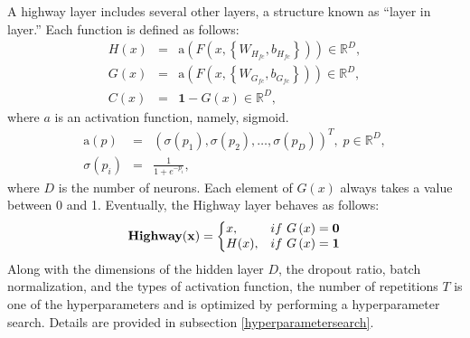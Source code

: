 \documentclass[useamsfonts]{pasj01}
\begin{document}
A highway layer includes several other layers, a structure known as ``layer in layer.'' Each function is defined as follows: 
\begin{eqnarray}
    H \left(x\right) &=& \mathrm{a} \left( F \left(x, \left\{W_{H_{fc}}, b_{H_{fc}}\right\}\right) \right) \in \mathbb{R}^D, \\
    G \left(x\right) &=& \mathrm{a} \left( F \left(x, \left\{W_{G_{fc}}, b_{G_{fc}}\right\}\right) \right) \in \mathbb{R}^D, \\
    C \left(x\right) &=& \mathbf{1} - G \left(x\right) \in \mathbb{R}^D,
\end{eqnarray}
where $a$ is an activation function, namely, sigmoid.
\begin{eqnarray*}
    \mathrm{a} \left(p\right) &=& \left( \sigma\left(p_1\right),\sigma\left(p_2\right), \ldots, \sigma\left(p_D\right) \right)^T, \; p \in \mathbb{R}^D, \\
    \sigma \left(p_i\right) &=& \frac{1}{1 + e^{-p_i}},
\end{eqnarray*}
where $D$ is the number of neurons. Each element of $G(x)$ always takes a value between 0 and 1. Eventually, the Highway layer behaves as follows:
\begin{equation}
    {\bf Highway(x)}=\left\{
    \begin{array}{@{}ll@{}}
      x, & \mathrm{if} \ G \left(x\right)= \mathbf{0} \\
      H(x), & \mathrm{if} \ G \left(x\right)= \mathbf{1} 
    \end{array}\right.
\end{equation}
Along with the dimensions of the hidden layer $D$, the dropout ratio, batch normalization, and the types of activation function, the number of repetitions $T$ is one of the hyperparameters and is optimized by performing a hyperparameter search. Details are provided in subsection \ref{hyperparametersearch}.
\end{document}
